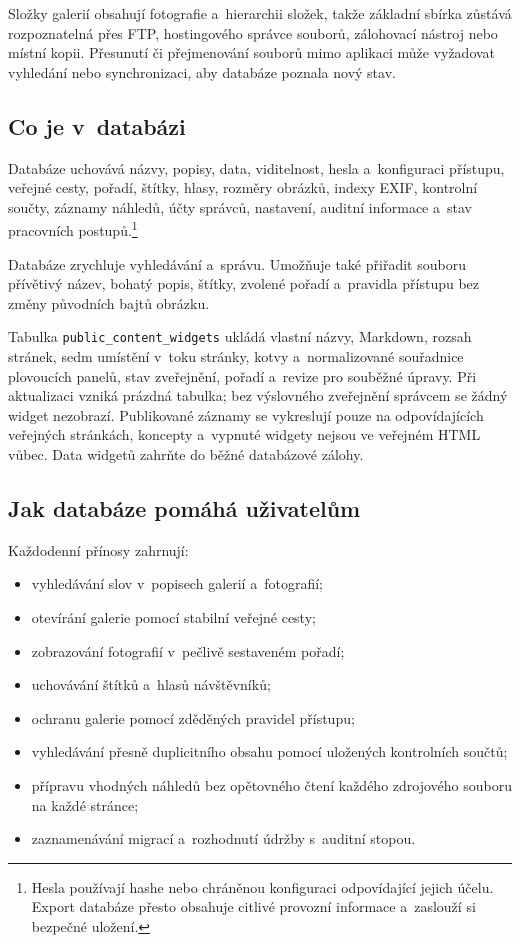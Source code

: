 \documentclass[11pt,a4paper]{article}
\begin{document}
Složky galerií obsahují fotografie a~hierarchii složek, takže základní sbírka
zůstává rozpoznatelná přes FTP, hostingového správce souborů, zálohovací nástroj
nebo místní kopii. Přesunutí či přejmenování souborů mimo aplikaci může
vyžadovat vyhledání nebo synchronizaci, aby databáze poznala nový stav.

\subsection{Co je v~databázi}

Databáze uchovává názvy, popisy, data, viditelnost, hesla a~konfiguraci
přístupu, veřejné cesty, pořadí, štítky, hlasy, rozměry obrázků, indexy EXIF,
kontrolní součty, záznamy náhledů, účty správců, nastavení, auditní informace
a~stav pracovních postupů.\footnote{Hesla používají hashe nebo chráněnou
konfiguraci odpovídající jejich účelu. Export databáze přesto obsahuje citlivé
provozní informace a~zaslouží si bezpečné uložení.}

Databáze zrychluje vyhledávání a~správu. Umožňuje také přiřadit souboru
přívětivý název, bohatý popis, štítky, zvolené pořadí a~pravidla přístupu bez
změny původních bajtů obrázku.

Tabulka \texttt{public\_content\_widgets} ukládá vlastní názvy, Markdown, rozsah
stránek, sedm umístění v~toku stránky, kotvy a~normalizované souřadnice
plovoucích panelů, stav zveřejnění, pořadí a~revize pro souběžné úpravy. Při
aktualizaci vzniká prázdná tabulka; bez výslovného zveřejnění správcem se žádný
widget nezobrazí. Publikované záznamy se vykreslují pouze na odpovídajících
veřejných stránkách, koncepty a~vypnuté widgety nejsou ve veřejném HTML vůbec.
Data widgetů zahrňte do běžné databázové zálohy.

\subsection{Jak databáze pomáhá uživatelům}

Každodenní přínosy zahrnují:

\begin{itemize}
  \item vyhledávání slov v~popisech galerií a~fotografií;
  \item otevírání galerie pomocí stabilní veřejné cesty;
  \item zobrazování fotografií v~pečlivě sestaveném pořadí;
  \item uchovávání štítků a~hlasů návštěvníků;
  \item ochranu galerie pomocí zděděných pravidel přístupu;
  \item vyhledávání přesně duplicitního obsahu pomocí uložených kontrolních
  součtů;
  \item přípravu vhodných náhledů bez opětovného čtení každého zdrojového
  souboru na každé stránce;
  \item zaznamenávání migrací a~rozhodnutí údržby s~auditní stopou.
\end{itemize}
\end{document}
